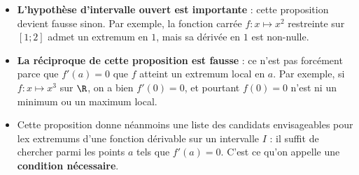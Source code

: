 \documentclass{article}
\begin{document}
\begin{remark}
\hfill
\begin{itemize}
\item \textbf{L'hypothèse d'intervalle ouvert est importante} : cette proposition devient fausse sinon. Par exemple, la fonction carrée $f \colon x \mapsto x^2$ restreinte sur $[1;2]$ admet un extremum en $1$, mais sa dérivée en $1$ est non-nulle.
\item \textbf{La réciproque de cette proposition est fausse} : ce n'est pas forcément parce que $f'(a) = 0$ que $f$ atteint un extremum local en $a$. Par exemple, si $f \colon x \mapsto x^3$ sur $\R$, on a bien $f'(0) = 0$, et pourtant $f(0) = 0$ n'est ni un minimum ou un maximum local.
\item Cette proposition donne néanmoins une liste des candidats envisageables pour lex extremums d'une fonction dérivable sur un intervalle $I$ : il suffit de chercher parmi les points $a$ tels que $f'(a) = 0$. C'est ce qu'on appelle une \textbf{condition nécessaire}.
\end{itemize}
\end{remark}
\end{document}
